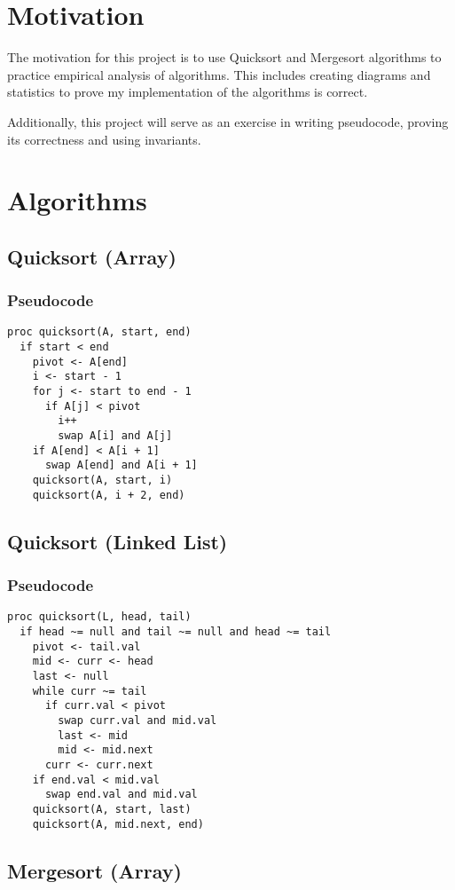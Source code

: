 \documentclass[a4paper,12pt]{article}
\begin{document}
\section{Motivation}

The motivation for this project is to use Quicksort and Mergesort algorithms to practice empirical analysis of algorithms.
This includes creating diagrams and statistics to prove my implementation of the algorithms is correct.

Additionally, this project will serve as an exercise in writing pseudocode, proving its correctness and using invariants.

\section{Algorithms}
\subsection{Quicksort (Array)}
\subsubsection{Pseudocode}
\begin{verbatim}
proc quicksort(A, start, end)
  if start < end
    pivot <- A[end]
    i <- start - 1 
    for j <- start to end - 1
      if A[j] < pivot
        i++
        swap A[i] and A[j]
    if A[end] < A[i + 1]
      swap A[end] and A[i + 1]
    quicksort(A, start, i)
    quicksort(A, i + 2, end)
\end{verbatim}
\subsection{Quicksort (Linked List)}
\subsubsection{Pseudocode}
\begin{verbatim}
proc quicksort(L, head, tail)
  if head ~= null and tail ~= null and head ~= tail
    pivot <- tail.val
    mid <- curr <- head
    last <- null
    while curr ~= tail
      if curr.val < pivot
        swap curr.val and mid.val
        last <- mid
        mid <- mid.next
      curr <- curr.next
    if end.val < mid.val
      swap end.val and mid.val
    quicksort(A, start, last)
    quicksort(A, mid.next, end)
\end{verbatim}
\subsection{Mergesort (Array)}
\end{document}
